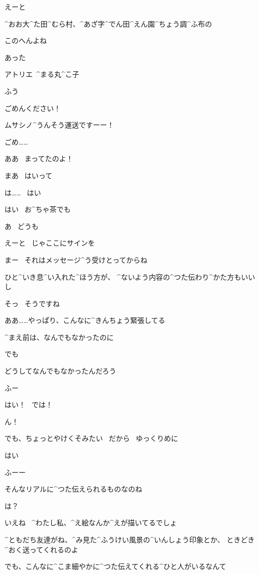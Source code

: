 \Kokone えーと

\Kokone ^{おお}{大}^{た}{田}^{むら}{村}、^{あざ}{字}^{でん}{田}^{えん}{園}^{ちょう}{調}^{ふ}{布}の

\Kokone このへんよね

\page[28]
\Kokone あった

\Sign アトリエ\ ^{まる}{丸}^{こ}{子}

\Kokone ふう

\page[29]
\Kokone ごめんください！

\Kokone ムサシノ^{うんそう}{運送}ですーー！

\Kokone ごめ……

\Maruko ああ
\ まってたのよ！

\Maruko まあ
\ はいって

\Kokone は……
\ はい

\page[30]
\Maruko はい
\ お^{ちゃ}{茶}でも

\Kokone あ
\ どうも

\Kokone えーと
\ じゃここにサインを

\Maruko まー
\ それはメッセージ^{う}{受}けとってからね

\Maruko ひと^{いき}{息}^{い}{入}れた^{ほう}{方}が、
^{ないよう}{内容}の^{つた}{伝}わり^{かた}{方}もいいし

\Kokone そっ
\ そうですね

\page[31]
\Kokone ああ……やっぱり、こんなに^{きんちょう}{緊張}してる

\Kokone ^{まえ}{前}は、なんでもなかったのに

\Kokone でも

\Kokone どうしてなんでもなかったんだろう

\Kokone ふー

\page[32]
\Kokone はい！
\ では！

\Maruko ん！

\Maruko でも、ちょっとやけくそみたい
\ だから
\ ゆっくりめに

\Kokone はい

\page[33]
\Maruko ふーー

\Maruko そんなリアルに^{つた}{伝}えられるものなのね

\Kokone は？

\Maruko いえね
\ ^{わたし}{私}、^{え}{絵}なんか^{えが}{描}いてるでしょ

\Maruko ^{ともだち}{友達}がね、^{み}{見}た^{ふうけい}{風景}の^{いんしょう}{印象}とか、
ときどき^{おく}{送}ってくれるのよ

\page[34]
\Maruko でも、こんなに^{こま}{細}やかに^{つた}{伝}えてくれる^{ひと}{人}がいるなんて

